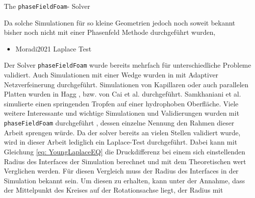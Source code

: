 The \texttt{phaseFieldFoam}- Solver 

Da solche Simulationen für so kleine Geometrien jedoch noch soweit bekannt bisher noch nicht mit einer Phasenfeld Methode durchgeführt wurden, 

\begin{itemize}
    \item Moradi2021 Laplace Test
\end{itemize}


Der Solver \texttt{phaseFieldFoam} wurde bereits mehrfach für unterschiedliche Probleme validiert. Auch Simulationen mit einer Wedge wurden in \cite{holzinger2021DirectNumericalSimulation} mit Adaptiver Netzverfeinerung durchgeführt. Simulationen von Kapillaren oder auch parallelen Platten wurden in Hagg \cite{hagg2019DirekteNumerischeSimulation}, bzw. von Cai et al. \cite{cai2015NumericalSimulationWetting} durchgeführt. Samkhaniani et al. \cite{samkhaniani2021BouncingDropImpingement} simulierte einen springenden Tropfen auf einer hydrophoben Oberfläche. Viele weitere Interessante und wichtige Simulationen und Validierungen wurden mit \texttt{phaseFieldFoam} durchgeführt \cite{bodziony2023StressfulWayDroplets,yinDirectNumericalSimulation,worner2021SpreadingReboundDynamics,bagheriInterfacialRelaxationCrucial2022}, dessen einzelne Nennung den Rahmen dieser Arbeit sprengen würde. 
Da der solver bereits an vielen Stellen validiert wurde, wird in dieser Arbeit lediglich ein Laplace-Test durchgeführt. Dabei kann mit Gleichung \ref{eq: YoungLaplaceEQ} die Druckdifferenz bei einem sich einstellenden Radius des Interfaces der Simulation berechnet und mit dem Theoretischen wert Verglichen werden. Für diesen Vergleich muss der Radius des Interfaces in der Simulation bekannt sein. Um diesen zu erhalten, kann unter der Annahme, dass der Mittelpunkt des Kreises auf der Rotationsachse liegt, der Radius mit 









